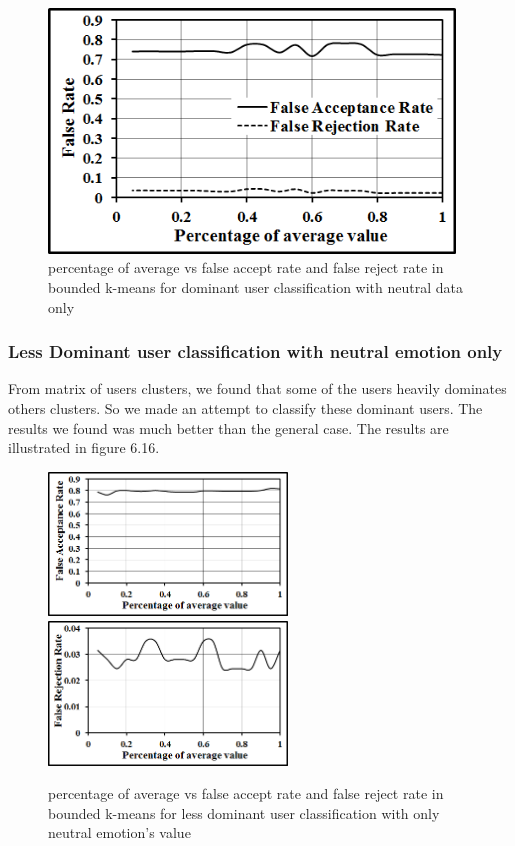 \begin{figure}
\centering
\includegraphics[width=4.25in,clip,keepaspectratio]{Chapters/figures/User/dominantWithNeutral/fAfR}

\caption{percentage of average vs false accept rate and false reject rate in bounded k-means for dominant user classification with neutral data only}
\label{Optional 6}
\end{figure}

\clearpage
\subsubsection{Less Dominant user classification with neutral emotion only}
From matrix of users clusters, we found that some of the users heavily dominates others clusters. So we made an attempt to classify these dominant users. The results we found was much better than the general case. The results are illustrated in figure 6.16.

\begin{figure}
\centering
\includegraphics[width=2.5in,clip,keepaspectratio]{Chapters/figures/User/lessDominantWithNeutral/fA}
\includegraphics[width=2.5in,clip,keepaspectratio]{Chapters/figures/User/lessDominantWithNeutral/fR}
\caption{percentage of average vs false accept rate and false reject rate in bounded k-means for less dominant user classification with only neutral emotion's value}
\label{Optional 6}
\end{figure}

